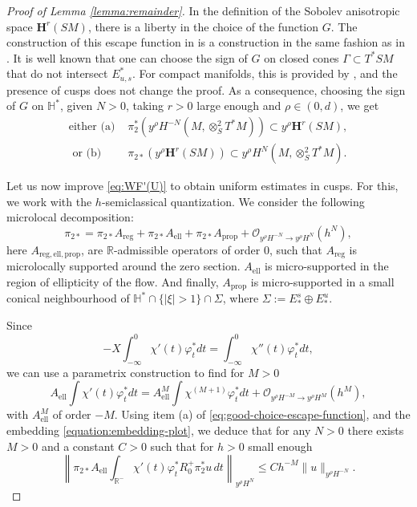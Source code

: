 \documentclass[JEP,XML,SOM,Unicode,NoFloatCountersInSection]{cedram}
\newcommand{\bH}{\boldsymbol{H}}
\newcommand{\R}{\mathbb{R}}
\newcommand{\HH}{\mathbb{H}}
\theoremstyle{plain}
\theoremstyle{definition}
\begin{document}
\begin{proof}[Proof of Lemma \ref{lemma:remainder}]
In the definition of the Sobolev anisotropic space $\bH^r(SM)$, there is a liberty in the choice of the function $G$. The construction of this escape function in \cite[\S 2.1]{Bonthonneau-Weich-17} is a construction in the same fashion as in \cite{Faure-Sjostrand-11}. It is well known that one can choose the sign of $G$ on closed cones $\Gamma\subset T^\ast SM$ that do not intersect $E^\ast_{u,s}$. For compact manifolds, this is provided by \cite[Lem.\,3.2]{Dang-Guillarmou-Riviere-Shen-19}, and the presence of cusps does not change the proof. As a consequence, choosing the sign of $G$ on $\HH^\ast$, given $N>0$, taking $r>0$ large enough and $\rho\in (0,d)$, we get
\begin{equation}\label{eq:good-choice-escape-function}
\begin{split}
\text{either (a) } & \pi_2^\ast (y^\rho H^{-N}(M,\otimes^2_S T^*M)) \subset y^\rho \bH^r(SM), \\
\text{ or (b) } & \pi_{2\ast} (y^\rho \bH^r(SM)) \subset y^\rho H^N(M,\otimes^2_S T^*M).
\end{split}
\end{equation}

Let us now improve \eqref{eq:WF'(U)} to obtain uniform estimates in cusps. For this, we work with the $h$-semiclassical quantization. We consider the following microlocal decomposition:
\[
\pi_{2\ast} = \pi_{2\ast}A_{\mathrm{reg}} + \pi_{2\ast}A_{\mathrm{ell}} + \pi_{2\ast}A_{\mathrm{prop}} + \mathcal{O}_{y^\rho H^{-N}\to y^\rho H^{N} }(h^N),
\]
here $A_{\mathrm{reg,ell,prop}}$, are $\R$-admissible operators of order $0$, such that $A_{\mathrm{reg}}$ is microlocally supported around the zero section. $A_{\mathrm{ell}}$ is micro-supported in the region of ellipticity of the flow. And finally, $A_{\mathrm{prop}}$ is micro-supported in a small conical neighbourhood of $\HH^\ast\cap\{|\xi|> 1\} \cap \Sigma$, where $\Sigma := E^s_* \oplus E^u_*$.

Since
\[
- X \int_{-\infty}^{0} \chi'(t) \varphi_t^\ast dt = \int_{-\infty}^{0} \chi''(t) \varphi_t^\ast dt,
\]
we can use a parametrix construction to find for $M>0$
\[
A_\mathrm{ell} \int \chi'(t) \varphi_t^\ast dt = A^M_\mathrm{ell} \int \chi^{(M+1)} \varphi_t^\ast dt + \mathcal{O}_{y^\rho H^{-M}\to y^\rho H^{M} }( h^M),
\]
with $A^M_\mathrm{ell}$ of order $-M$. Using item (a) of \eqref{eq:good-choice-escape-function}, and the embedding \eqref{equation:embedding-plot}, we deduce that for any $N>0$ there exists $M>0$ and a constant $C>0$ such that for $h>0$ small enough
\[
\left\|\pi_{2\ast} A_\mathrm{ell} \int_{\R^-} \chi'(t) \varphi_t^\ast R_0^+ \pi_2^\ast u\, dt \right\|_{y^\rho H^{N}} \leq C h^{-M} \| u \|_{y^\rho H^{-N}}.
\]


\end{proof}
\end{document}
